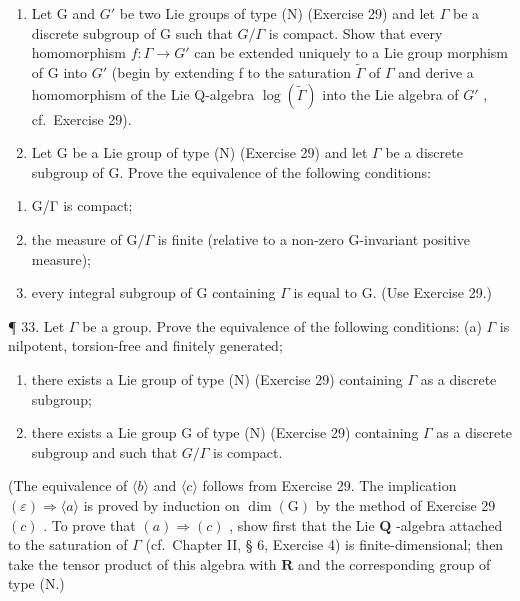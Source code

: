 \begin{enumerate}
\def\labelenumi{\arabic{enumi}.}
\setcounter{enumi}{30}
\item
  Let G and \(G'\) be two Lie groups of type (N) (Exercise 29) and let \(\Gamma\) be a discrete subgroup of G such that \(G/\Gamma\) is compact. Show that every homomorphism \(f: \Gamma \to G'\) can be extended uniquely to a Lie group morphism of G into \(G'\) (begin by extending f to the saturation \(\tilde{\Gamma}\) of \(\Gamma\) and derive a homomorphism of the Lie Q-algebra \(\log(\tilde{\Gamma})\) into the Lie algebra of \(G'\) , cf.~Exercise 29).
\item
  Let G be a Lie group of type (N) (Exercise 29) and let \(\Gamma\) be a discrete subgroup of G. Prove the equivalence of the following conditions:
\end{enumerate}

\begin{enumerate}
\def\labelenumi{(\alph{enumi})}
\item
  G/Γ is compact;
\item
  the measure of \(\mathrm{G} / \Gamma\) is finite (relative to a non-zero G-invariant positive measure);
\item
  every integral subgroup of G containing \(\Gamma\) is equal to G. (Use Exercise 29.)
\end{enumerate}

¶ 33. Let \(\Gamma\) be a group. Prove the equivalence of the following conditions: (a) \(\Gamma\) is nilpotent, torsion-free and finitely generated;

\begin{enumerate}
\def\labelenumi{(\alph{enumi})}
\setcounter{enumi}{1}
\item
  there exists a Lie group of type (N) (Exercise 29) containing \(\Gamma\) as a discrete subgroup;
\item
  there exists a Lie group G of type (N) (Exercise 29) containing \(\Gamma\) as a discrete subgroup and such that \(G / \Gamma\) is compact.
\end{enumerate}

(The equivalence of \(\langle b\rangle\) and \(\langle c\rangle\) follows from Exercise 29. The implication \((\varepsilon)\Rightarrow \langle a\rangle\) is proved by induction on \(\dim (\mathrm{G})\) by the method of Exercise 29 \((c)\) . To prove that \((a)\Rightarrow (c)\) , show first that the Lie \(\mathbf{Q}\) -algebra attached to the saturation of \(\Gamma\) (cf.~Chapter II, § 6, Exercise 4) is finite-dimensional; then take the tensor product of this algebra with \(\mathbf{R}\) and the corresponding group of type (N.)

